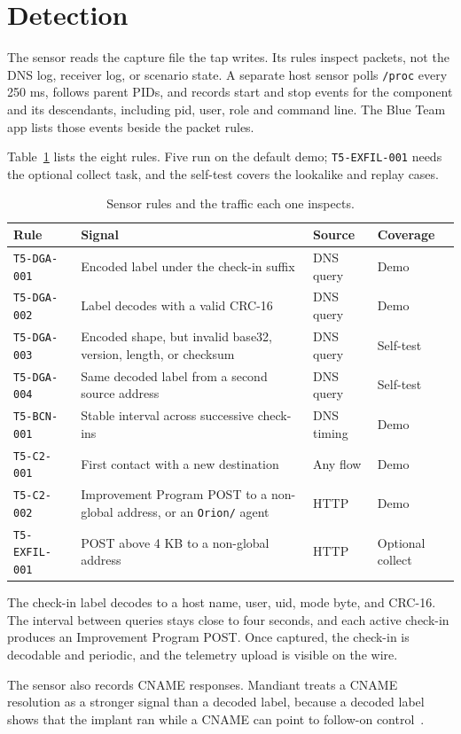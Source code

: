 \section{Detection}
\label{sec:detection}

The sensor reads the capture file the tap writes. Its rules inspect packets, not the DNS log, receiver log, or scenario state. A separate host sensor polls \texttt{/proc} every 250 ms, follows parent PIDs, and records start and stop events for the component and its descendants, including pid, user, role and command line. The Blue Team app lists those events beside the packet rules.

Table~\ref{tab:rules} lists the eight rules. Five run on the default demo; \texttt{T5-EXFIL-001} needs the optional collect task, and the self-test covers the lookalike and replay cases.

\begin{table}[H]
\centering
\footnotesize
{}
\caption{Sensor rules and the traffic each one inspects.}
\label{tab:rules}
\begin{tabular}{@{}>{\RaggedRight}p{2.2cm}>{\RaggedRight}p{6.4cm}>{\RaggedRight}p{2.7cm}>{\RaggedRight}p{2.8cm}@{}}
\toprule
\textbf{Rule} & \textbf{Signal} & \textbf{Source} & \textbf{Coverage} \\
\midrule
\texttt{T5-DGA-001} & Encoded label under the check-in suffix & DNS query & Demo \\
\texttt{T5-DGA-002} & Label decodes with a valid CRC-16 & DNS query & Demo \\
\texttt{T5-DGA-003} & Encoded shape, but invalid base32, version, length, or checksum & DNS query & Self-test \\
\texttt{T5-DGA-004} & Same decoded label from a second source address & DNS query & Self-test \\
\texttt{T5-BCN-001} & Stable interval across successive check-ins & DNS timing & Demo \\
\texttt{T5-C2-001} & First contact with a new destination & Any flow & Demo \\
\texttt{T5-C2-002} & Improvement Program POST to a non-global address, or an \texttt{Orion/} agent & HTTP & Demo \\
\texttt{T5-EXFIL-001} & POST above 4 KB to a non-global address & HTTP & Optional collect \\
\bottomrule
\end{tabular}
\end{table}

The check-in label decodes to a host name, user, uid, mode byte, and CRC-16. The interval between queries stays close to four seconds, and each active check-in produces an Improvement Program POST. Once captured, the check-in is decodable and periodic, and the telemetry upload is visible on the wire.

The sensor also records CNAME responses. Mandiant treats a CNAME resolution as a stronger signal than a decoded label, because a decoded label shows that the implant ran while a CNAME can point to follow-on control~\cite{mandiant-sunburst-details}.
